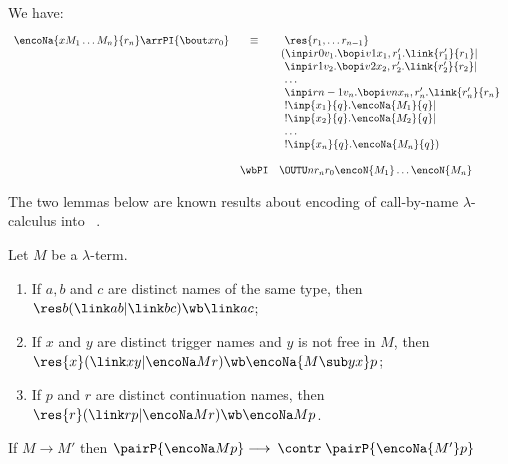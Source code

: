 \begin{lemma} 
We have: 
\[
\begin{array}[t]{rcl}
\encoNa{ x M_1 \ldots M_n} {r_n}
\arrPI{\bout x{r_0}}
&\equiv  &
\begin{array}[t]{l}
\res{r_1, \ldots r_{n-1}} \\
\! \! (\inpi r 0 {v_1} . \bopi v 1{x_{1},r'_{1}}    .  \link {r'_{1}}{r_{1}}
 | \\
\inpi r 1 {v_2} . \bopi v 2{x_{2},r'_{2}}    .  \link {r'_{2}}{r_{2}}
 | \\
\ldots  \\
\inpi r {n-1} {v_n} . \bopi v n{x_{n},r'_{n}}    .  \link
{r'_{n}}{r_{n}} \\
  !  \inp {x_1} {q} . {\encoNa{M_1} {q} } | \\
  !  \inp {x_2} {q} . {\encoNa{M_2}{q} } | \\
\ldots  \\
  !  \inp {x_n} {q} . {\encoNa{M_n}{q} } )
\end{array}
\\ \ \\
&\wbPI &
\OUTU n {r_n}{r_0} {\encoN{M_1} \ldots \encoN{M_n}}{} 
\end{array}
\]
 \end{lemma}
\noindent
The two lemmas below are known results about encoding of call-by-name $\lambda$-calculus
into \piI\  \cite{San95i}. 


\begin{lemma} %
\label{l:sk}
 Let $M $ be a  $\lambda$-term.
$ $ 
\begin{enumerate}
\item  If  $a,b$ and $c$  are distinct names of the same type,  then 
  $\res b ( \link ab | \link bc ) \wb \link ac$; 


\item  If $x$ and $y$ are distinct  trigger  names and $y$ is not free in
$M$, then
  $\res{ x} (\link  xy  | \encoNa M r ) \wb \encoNa{ M
\sub y x} p$;   


\item  If $p$ and $r$ are distinct  continuation names, then 
 $\res{ r} (\link  r p | \encoNa M r ) \wb \encoNa  M p$.

\end{enumerate} 
\end{lemma} 


\begin{lemma} %
\label{l:beta_cbn}
If $M \longrightarrow M'$ then $\pairP {\encoNa M p } \longrightarrow \: {\contr}\; \pairP
{\encoNa        {M'} p }$
\end{lemma} 



